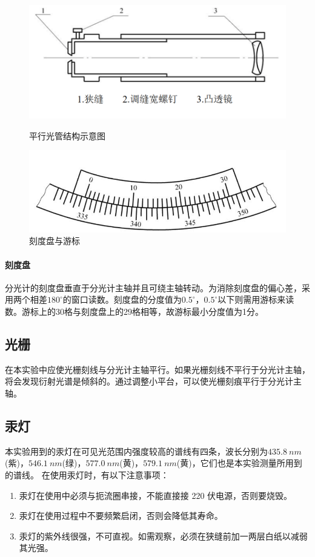 \documentclass[UTF8,a4paper]{article}%
\begin{document}
\begin{figure}[H] %
    \centering
    \begin{minipage}[t]{0.5\linewidth}
        \centering
        \includegraphics[width=0.95\linewidth]{平行光管.png}
        \caption{平行光管结构示意图}
        \label{}
    \end{minipage}%
    \begin{minipage}[t]{0.5\linewidth}
        \centering
        \includegraphics[width=0.95\linewidth]{刻度盘.png}
        \caption{刻度盘与游标}
        \label{}
    \end{minipage}
\end{figure}

\paragraph{刻度盘}
分光计的刻度盘垂直于分光计主轴并且可绕主轴转动。为消除刻度盘的偏心差，采用两个相差$180^\circ$的窗口读数。刻度盘的分度值为$0.5^\circ$，$0.5^\circ$以下则需用游标来读数。游标上的30格与刻度盘上的29格相等，故游标最小分度值为1分。
\subsection{光栅}
在本实验中应使光栅刻线与分光计主轴平行。如果光栅刻线不平行于分光计主轴，将会发现衍射光谱是倾斜的。通过调整小平台，可以使光栅刻痕平行于分光计主轴。
\subsection{汞灯}
本实验用到的汞灯在可见光范围内强度较高的谱线有四条，波长分别为$\qty{435.8}{nm}$(紫)，$\qty{546.1}{nm}$(绿)，$\qty{577.0}{nm}$(黄)，$\qty{579.1}{nm}$(黄)，它们也是本实验测量所用到的谱线。
在使用汞灯时，有以下注意事项：
\begin{enumerate}
    \item 汞灯在使用中必须与扼流圈串接，不能直接接 220 伏电源，否则要烧毁。
    \item 汞灯在使用过程中不要频繁启闭，否则会降低其寿命。
    \item 汞灯的紫外线很强，不可直视。如需观察，必须在狭缝前加一两层白纸以减弱其光强。
\end{enumerate}
\end{document}
